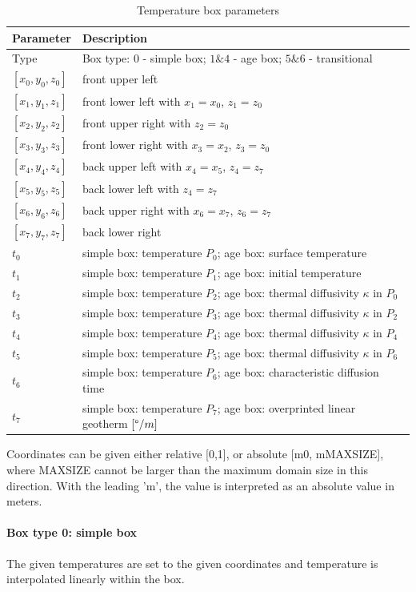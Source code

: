 \begin{table}[H]
\begin{table}[H]
\centering
\begin{tabular}{l l}
\toprule
Parameter		& Description\\
\midrule
Type			& Box type: $0$ - simple box; $1\&4$ - age box; $5\&6$ - transitional\\
$[x_0,y_0,z_0]$ & front upper left\\
$[x_1,y_1,z_1]$ & front lower left with $x_1=x_0$, $z_1=z_0$\\
$[x_2,y_2,z_2]$ & front upper right with $z_2=z_0$\\ 
$[x_3,y_3,z_3]$ & front lower right with $x_3=x_2$, $z_3=z_0$\\ 
$[x_4,y_4,z_4]$ & back upper left with $x_4=x_5$, $z_4=z_7$\\  
$[x_5,y_5,z_5]$ & back lower left with $z_4=z_7$\\ 
$[x_6,y_6,z_6]$ & back upper right with $x_6=x_7$, $z_6=z_7$\\
$[x_7,y_7,z_7]$ & back lower right\\
$t_0$ & simple box: temperature $P_0$; age box: surface temperature\\
$t_1$ & simple box: temperature $P_1$; age box: initial temperature\\
$t_2$ & simple box: temperature $P_2$; age box: thermal diffusivity $\kappa$ in $P_0$\\
$t_3$ & simple box: temperature $P_3$; age box: thermal diffusivity $\kappa$ in $P_2$\\
$t_4$ & simple box: temperature $P_4$; age box: thermal diffusivity $\kappa$ in $P_4$\\
$t_5$ & simple box: temperature $P_5$; age box: thermal diffusivity $\kappa$ in $P_6$\\
$t_6$ & simple box: temperature $P_6$; age box: characteristic diffusion time\\
$t_7$ & simple box: temperature $P_7$; age box: overprinted linear geotherm $[\degree/m]$\\
\bottomrule
\end{tabular}
\caption{Temperature box parameters}
\label{tbl:t_box_parameters}
\end{table}

Coordinates can be given either relative [0,1], or absolute [m0, mMAXSIZE], where MAXSIZE cannot be larger than the maximum domain size in this direction. With the leading 'm', the value is interpreted as an absolute value in meters.

\paragraph{Box type 0: simple box}
The given temperatures are set to the given coordinates and temperature is interpolated linearly within the box.


\end{table}
